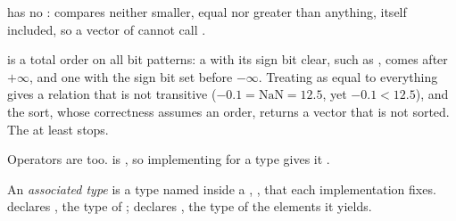 \label{lst:b2:rust-traits-and-generics:people}

\label{out:b2:rust-traits-and-generics:people}

 has no :  compares neither smaller, equal nor greater than anything, itself included,
so a vector of  cannot call .

\label{out:b2:rust-traits-and-generics:float}

 is a total order on all bit patterns: a  with its sign bit clear, such as
, comes after $+\infty$, and one with the sign bit set before $-\infty$. Treating  as
equal to everything gives a relation that is not transitive ($-0.1 = \mathrm{NaN} = 12.5$, yet $-0.1 < 12.5$), and
the sort, whose correctness assumes an order, returns a vector that is not sorted. The  at least stops.

Operators are  too.  is , so implementing  for a type gives it
\code{+}.

\begin{definition}\label{def:b2:rust-traits-and-generics:associated}
An \emph{associated type} is a type named inside a , , that each
implementation fixes.  declares , the type of ;  declares
, the type of the elements it yields.
\end{definition}

\label{lst:b2:rust-traits-and-generics:vector}

\label{out:b2:rust-traits-and-generics:vector}

